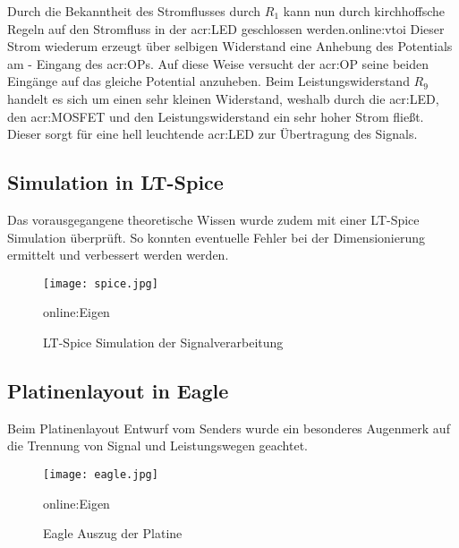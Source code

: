 Durch die Bekanntheit des Stromflusses durch $R_1$ kann nun durch kirchhoffsche Regeln auf den Stromfluss in der \gls{acr:LED} geschlossen werden.\gls{online:vtoi} Dieser Strom wiederum erzeugt über selbigen Widerstand eine Anhebung des Potentials am - Eingang des \gls{acr:OP}s. Auf diese Weise versucht der \gls{acr:OP} seine beiden Eingänge auf das gleiche Potential anzuheben. Beim Leistungswiderstand $R_{9}$ handelt es sich um einen sehr kleinen Widerstand, weshalb durch die \gls{acr:LED}, den \gls{acr:MOSFET} und den Leistungswiderstand ein sehr hoher Strom fließt. Dieser sorgt für eine hell leuchtende \gls{acr:LED} zur Übertragung des Signals.

\subsection{Simulation in LT-Spice}
\label{subsec:Unterabschnitt1}

Das vorausgegangene theoretische Wissen wurde zudem mit einer LT-Spice Simulation überprüft. So konnten eventuelle Fehler bei der Dimensionierung ermittelt und verbessert werden werden. 

\begin{figure}[H]
	\centering
	\texttt{[image: spice.jpg]}
	\caption[LT-Spice Simulation der Signalverarbeitung]{LT-Spice Simulation der Signalverarbeitung} \gls{online:Eigen}
	\label{fig:spice}
\end{figure}

\subsection{Platinenlayout in Eagle}
\label{subsec:Unterabschnitt12}

Beim Platinenlayout Entwurf vom Senders wurde ein besonderes Augenmerk auf die Trennung von Signal und Leistungswegen geachtet.

\begin{figure}[H]
	\centering
	\texttt{[image: eagle.jpg]}
	\caption[Eagle Auszug der Platine]{Eagle Auszug der Platine} \gls{online:Eigen}
	\label{fig:eagle}
\end{figure}

